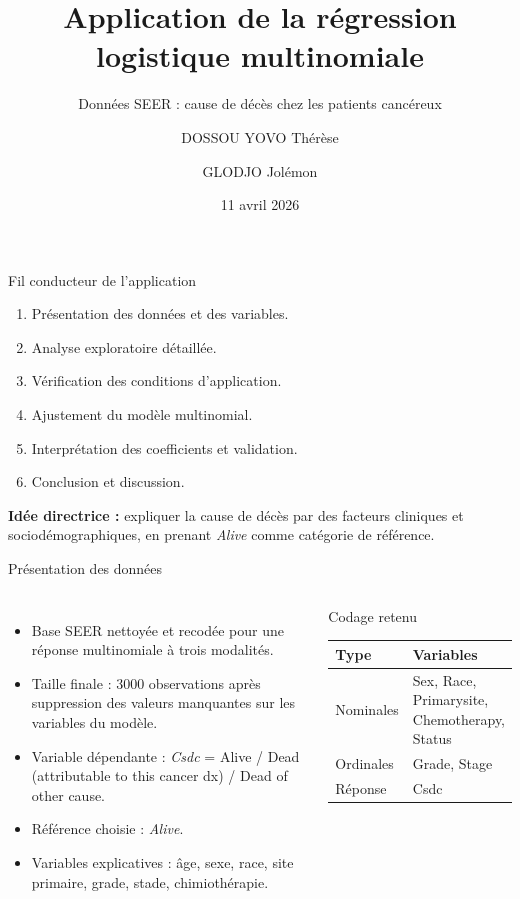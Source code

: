 \documentclass[10pt,aspectratio=169]{beamer}
\title[Application RLM]{Application de la régression logistique multinomiale}
\subtitle{Données SEER : cause de décès chez les patients cancéreux}
\author{DOSSOU YOVO Thérèse \and GLODJO Jolémon}
\date{11 avril 2026}
\begin{document}
\begin{frame}
  \titlepage
\end{frame}

\begin{frame}{Fil conducteur de l’application}
\begin{enumerate}
  \item Présentation des données et des variables.
  \item Analyse exploratoire détaillée.
  \item Vérification des conditions d’application.
  \item Ajustement du modèle multinomial.
  \item Interprétation des coefficients et validation.
  \item Conclusion et discussion.
\end{enumerate}
\vspace{0.5em}
\textbf{Idée directrice :} expliquer la cause de décès par des facteurs cliniques et sociodémographiques, en prenant \textit{Alive} comme catégorie de référence.
\end{frame}

\begin{frame}{Présentation des données}
\begin{columns}[T,onlytextwidth]
  \begin{itemize}
    \item Base SEER nettoyée et recodée pour une réponse multinomiale à trois modalités.
    \item Taille finale : 3000 observations après suppression des valeurs manquantes sur les variables du modèle.
    \item Variable dépendante : \textit{Csdc} = Alive / Dead (attributable to this cancer dx) / Dead of other cause.
    \item Référence choisie : \textit{Alive}.
    \item Variables explicatives : âge, sexe, race, site primaire, grade, stade, chimiothérapie.
  \end{itemize}
  \begin{block}{Codage retenu}
  \small
  \begin{tabular}{@{}ll@{}}
  \toprule
  \textbf{Type} & \textbf{Variables} \\
  \midrule
  Nominales & Sex, Race, Primarysite, Chemotherapy, Status \\
  Ordinales & Grade, Stage \\
  Réponse & Csdc \\
  \bottomrule
  \end{tabular}
  \end{block}
\end{columns}
\end{frame}
\end{document}
